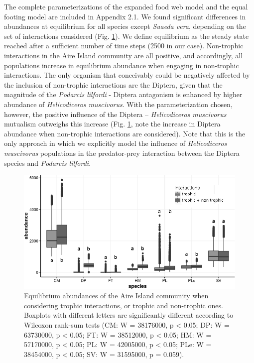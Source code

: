 The complete parameterizations of the expanded food web model and the equal footing model are included in Appendix 2.1. We found significant differences in abundances at equilibrium for all species except \textit{Suaeda vera}, depending on the set of interactions considered (Fig. \ref{fig:fig2.2}). We define equilibrium as the steady state reached after a sufficient number of time steps (2500 in our case). Non-trophic interactions in the Aire Island community are all positive, and accordingly, all populations increase in equilibrium abundance when engaging in non-trophic interactions. The only organism that conceivably could be negatively affected by the inclusion of non-trophic interactions are the Diptera, given that the magnitude of the \textit{Podarcis lilfordi} - Diptera antagonism is enhanced by higher abundance of \textit{Helicodiceros muscivorus}. With the parameterization chosen, however, the positive influence of the Diptera -- \textit{Helicodiceros muscivorus} mutualism outweighs this increase (Fig. \ref{fig:fig2.2}, note the increase in Diptera abundance when non-trophic interactions are considered). Note that this is the only approach in which we explicitly model the influence of \textit{Helicodiceros muscivorus} populations in the predator-prey interaction between the Diptera species and \textit{Podarcis lilfordi}.

\begin{figure}[ht]
\centering
\includegraphics[width=\textwidth]{./Figures/chapter02/Fig_2.png}
\caption[Expanded Food Web analysis]{\color{Gray} Equilibrium abundances of the Aire Island community when considering trophic interactions, or trophic and non-trophic ones. Boxplots with different letters are significantly different according to Wilcoxon rank-sum tests (CM: W = 38176000, p {\textless} 0.05; DP: W = 63730000, p {\textless} 0.05; FT: W = 38512000, p {\textless} 0.05; HM: W = 57170000, p {\textless} 0.05; PL: W = 42005000, p {\textless} 0.05; PLe: W = 38454000, p {\textless} 0.05; SV: W = 31595000, p = 0.059).}
\label{fig:fig2.2}
\end{figure}

